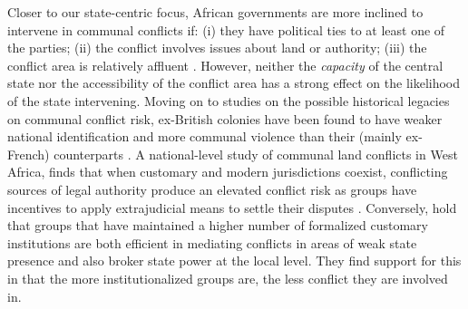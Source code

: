 Closer to our state-centric focus, African governments are more inclined to
intervene in communal conflicts if: (i) they have political ties to at least one
of the parties; (ii) the conflict involves issues about land or authority; (iii)
the conflict area is relatively affluent \citet{Elfversson2015} . However,
neither the \textit{capacity} of the central state nor the accessibility of the
conflict area has a strong effect on the likelihood of the state intervening.
Moving on to studies on the possible historical legacies on communal conflict
risk, ex-British colonies have been found to have weaker national identification
and more communal violence than their (mainly ex-French) counterparts
\citet{Ali_2018}. A national-level study of communal land conflicts in West
Africa, finds that when customary and modern jurisdictions coexist, conflicting
sources of legal authority produce an elevated conflict risk as groups have
incentives to apply extrajudicial means to settle their disputes
\citet{Eck2014}. Conversely, \citet{Wig2018} hold that groups that have
maintained a higher number of formalized customary institutions are both
efficient in mediating conflicts in areas of weak state presence and also broker
state power at the local level. They find support for this in that the more
institutionalized groups are, the less conflict they are involved in.

